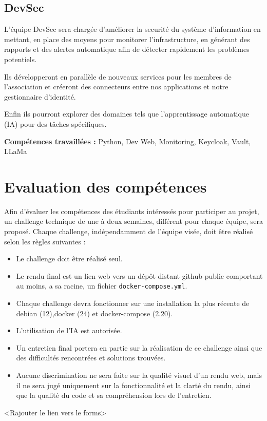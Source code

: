 \documentclass[12pt]{article}
\begin{document}
	
	\subsection{DevSec}
	L'équipe DevSec sera chargée d'améliorer la securité du système d'information en mettant, en place des moyens pour monitorer l'infrastructure, en générant des rapports et des alertes automatique afin de détecter rapidement les problèmes potentiels.
	\bigskip
	
	\noindent Ils développeront en parallèle de nouveaux services pour les membres de l'association et créeront des connecteurs entre nos applications et notre gestionnaire d'identité. 
	\bigskip
	
	\noindent Enfin ils pourront explorer des domaines tels que l'apprentissage automatique (IA) pour des tâches spécifiques.
	\bigskip
	
	\noindent \textbf{Compétences travaillées :} Python, Dev Web, Monitoring, Keycloak, Vault, LLaMa
	
	\section{Evaluation des compétences}
	
	Afin d'évaluer les compétences des étudiants intéressés pour participer au projet, un challenge technique de une à deux semaines, différent pour chaque équipe, sera proposé.
	Chaque challenge, indépendamment de  l'équipe visée, doit être réalisé selon les règles suivantes :
	\begin{itemize}
		\item Le challenge doit être réalisé seul.
		\item Le rendu final est un lien web vers un dépôt distant github public comportant au moins, a sa racine, un fichier \texttt{docker-compose.yml}.
		\item Chaque challenge devra fonctionner sur une installation la plus récente de debian (12),docker (24) et docker-compose (2.20).
		\item L'utilisation de l'IA est autorisée.
		\item Un entretien final portera en partie sur la réalisation de ce challenge ainsi que des difficultés rencontrées et solutions trouvées.
		\item Aucune discrimination ne sera faite sur la qualité visuel d'un rendu web, mais il ne sera jugé uniquement sur la fonctionnalité et la clarté du rendu, ainsi que la qualité du code et sa compréhension lors de l'entretien.
	\end{itemize}

	<Rajouter le lien vers le forms>
	
		
	
	
\end{document}

